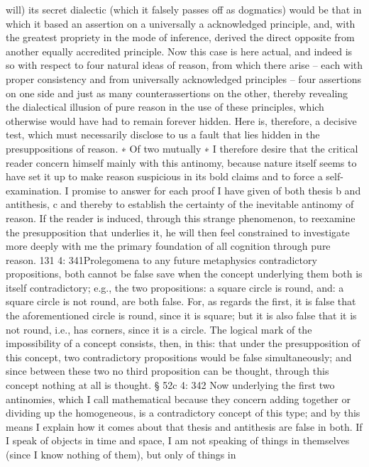 will) its secret dialectic (which it falsely passes off as dogmatics) would
be that in which it based an assertion on a universally a acknowledged
principle, and, with the greatest propriety in the mode of inference,
derived the direct opposite from another equally accredited principle.
Now this case is here actual, and indeed is so with respect to four natural
ideas of reason, from which there arise – each with proper consistency
and from universally acknowledged principles – four assertions on one
side and just as many counterassertions on the other, thereby revealing
the dialectical illusion of pure reason in the use of these principles, which
otherwise would have had to remain forever hidden.
Here is, therefore, a decisive test, which must necessarily disclose to us
a fault that lies hidden in the presuppositions of reason. ∗ Of two mutually
∗
I therefore desire that the critical reader concern himself mainly with this
antinomy, because nature itself seems to have set it up to make reason suspicious
in its bold claims and to force a self-examination. I promise to answer for each
proof I have given of both thesis b and antithesis, c and thereby to establish the
certainty of the inevitable antinomy of reason. If the reader is induced, through
this strange phenomenon, to reexamine the presupposition that underlies it,
he will then feel constrained to investigate more deeply with me the primary
foundation of all cognition through pure reason.
131
4: 341Prolegomena to any future metaphysics
contradictory propositions, both cannot be false save when the concept
underlying them both is itself contradictory; e.g., the two propositions:
a square circle is round, and: a square circle is not round, are both false.
For, as regards the ﬁrst, it is false that the aforementioned circle is round,
since it is square; but it is also false that it is not round, i.e., has corners,
since it is a circle. The logical mark of the impossibility of a concept
consists, then, in this: that under the presupposition of this concept,
two contradictory propositions would be false simultaneously; and since
between these two no third proposition can be thought, through this
concept nothing at all is thought.
§ 52c
4: 342
Now underlying the ﬁrst two antinomies, which I call mathematical
because they concern adding together or dividing up the homogeneous,
is a contradictory concept of this type; and by this means I explain how
it comes about that thesis and antithesis are false in both.
If I speak of objects in time and space, I am not speaking of things
in themselves (since I know nothing of them), but only of things in

